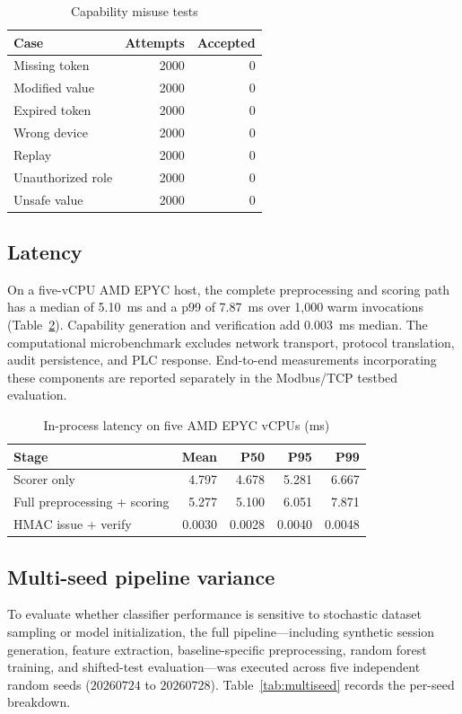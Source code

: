 \documentclass[journal]{IEEEtran}
\renewcommand{\arraystretch}{1.08}
\begin{document}
\begin{table}[t]
\centering
\caption{Capability misuse tests}
\label{tab:tokens}
\renewcommand{\arraystretch}{1.12}
\begin{tabular}{@{}lrr@{}}
\toprule
\textbf{Case} & \textbf{Attempts} & \textbf{Accepted} \\
\midrule
Missing token & 2000 & 0 \\
Modified value & 2000 & 0 \\
Expired token & 2000 & 0 \\
Wrong device & 2000 & 0 \\
Replay & 2000 & 0 \\
Unauthorized role & 2000 & 0 \\
Unsafe value & 2000 & 0 \\
\bottomrule
\end{tabular}
\end{table}

\subsection{Latency}
On a five-vCPU AMD EPYC host, the complete preprocessing and scoring path has a median of 5.10~ms and a p99 of 7.87~ms over 1,000 warm invocations (Table~\ref{tab:latency}). Capability generation and verification add 0.003~ms median. The computational microbenchmark excludes network transport, protocol translation, audit persistence, and PLC response. End-to-end measurements incorporating these components are reported separately in the Modbus/TCP testbed evaluation.

\begin{table}[t]
\centering
\caption{In-process latency on five AMD EPYC vCPUs (ms)}
\label{tab:latency}
\renewcommand{\arraystretch}{1.12}
\begin{tabular}{@{}lrrrr@{}}
\toprule
\textbf{Stage} & \textbf{Mean} & \textbf{P50} & \textbf{P95} & \textbf{P99} \\
\midrule
Scorer only & 4.797 & 4.678 & 5.281 & 6.667 \\
Full preprocessing + scoring & 5.277 & 5.100 & 6.051 & 7.871 \\
HMAC issue + verify & 0.0030 & 0.0028 & 0.0040 & 0.0048 \\
\bottomrule
\end{tabular}
\end{table}

\subsection{Multi-seed pipeline variance}
To evaluate whether classifier performance is sensitive to stochastic dataset sampling or model initialization, the full pipeline—including synthetic session generation, feature extraction, baseline-specific preprocessing, random forest training, and shifted-test evaluation—was executed across five independent random seeds ($20260724$ to $20260728$). Table~\ref{tab:multiseed} records the per-seed breakdown.
\end{document}
